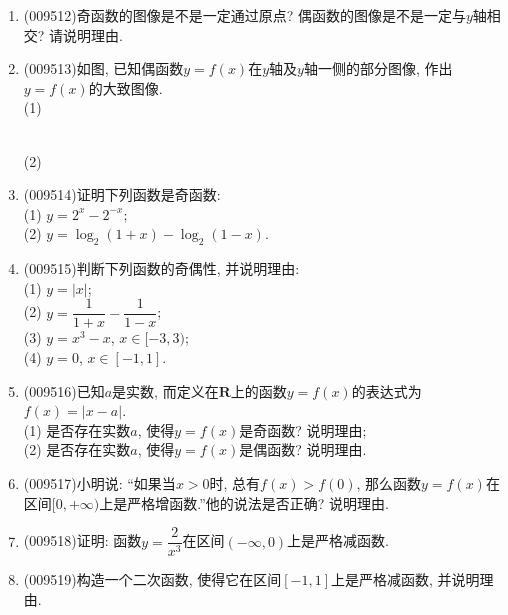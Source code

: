 \documentclass[10pt,a4paper]{article}
\begin{document}
\begin{enumerate}[1.]
\begin{center}
\end{center}
\item {\tiny (009512)}奇函数的图像是不是一定通过原点? 偶函数的图像是不是一定与$y$轴相交?  请说明理由.
\item {\tiny (009513)}如图, 已知偶函数$y=f(x)$在$y$轴及$y$轴一侧的部分图像, 作出$y=f(x)$的大致图像.\\
(1) \\
(2) 
\item {\tiny (009514)}证明下列函数是奇函数:\\
(1) $y=2^x-2^{-x}$;\\
(2) $y=\log_2(1+x)-\log_2(1-x)$.
\item {\tiny (009515)}判断下列函数的奇偶性, 并说明理由:\\
(1) $y=|x|$;\\
(2) $y=\dfrac 1{1+x}-\dfrac 1{1-x}$;\\
(3) $y=x^3-x$, $x\in [-3, 3)$;\\
(4) $y=0$, $x\in [-1, 1]$.
\item {\tiny (009516)}已知$a$是实数, 而定义在$\mathbf{R}$上的函数$y=f(x)$的表达式为$f(x)=|x-a|$.\\
(1) 是否存在实数$a$, 使得$y=f(x)$是奇函数? 说明理由;\\
(2) 是否存在实数$a$, 使得$y=f(x)$是偶函数? 说明理由.
\item {\tiny (009517)}小明说: ``如果当$x>0$时, 总有$f(x)>f(0)$, 那么函数$y=f(x)$在区间$[0, +\infty)$上是严格增函数.''他的说法是否正确? 说明理由.
\item {\tiny (009518)}证明: 函数$y=\dfrac2{x^3}$在区间$(-\infty, 0)$上是严格减函数.
\item {\tiny (009519)}构造一个二次函数, 使得它在区间$[-1, 1]$上是严格减函数, 并说明理由.

\end{enumerate}
\end{document}
